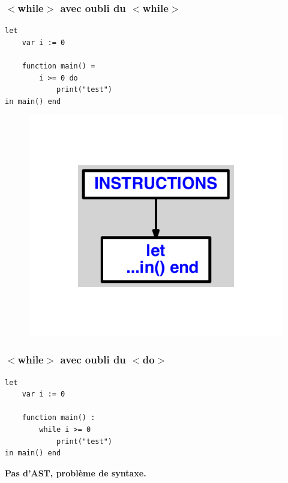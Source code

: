 \documentclass{article}
\begin{document}
\subsubsection{$ < $while$ > $ avec oubli du $ < $while$ > $}
\begin{lstlisting}
let
	var i := 0

	function main() =
		i >= 0 do
			print("test")
in main() end
\end{lstlisting}
\newpage
\begin{figure}[H]
\centering
\includegraphics[max width=\textwidth]{ast/ast_326.pdf}
\end{figure}
\newpage
\subsubsection{$ < $while$ > $ avec oubli du $ < $do$ > $}
\begin{lstlisting}
let
	var i := 0

	function main() :
		while i >= 0
			print("test")
in main() end
\end{lstlisting}
\newpage
{\color{red}\textbf{Pas d'AST, problème de syntaxe.}}
\newpage
\end{document}
